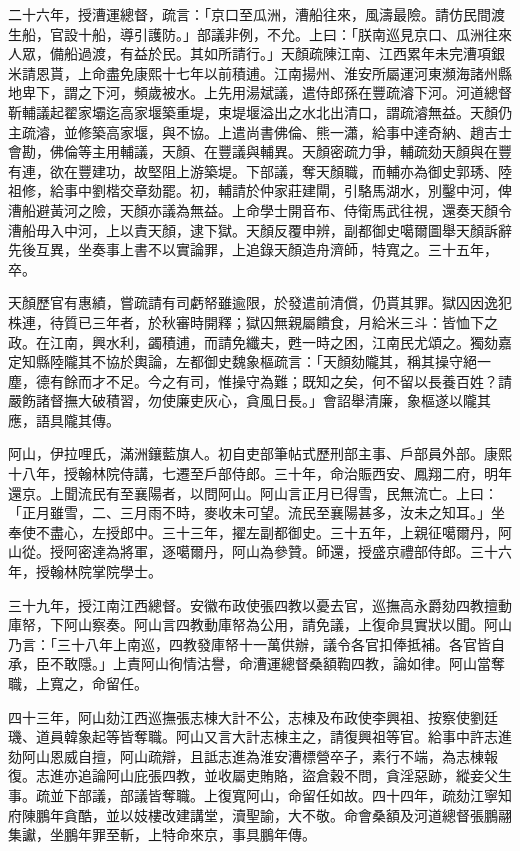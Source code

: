 \begin{pinyinscope}
二十六年，授漕運總督，疏言：「京口至瓜洲，漕船往來，風濤最險。請仿民間渡生船，官設十船，導引護防。」部議非例，不允。上曰：「朕南巡見京口、瓜洲往來人眾，備船過渡，有益於民。其如所請行。」天顏疏陳江南、江西累年未完漕項銀米請恩貰，上命盡免康熙十七年以前積逋。江南揚州、淮安所屬運河東瀕海諸州縣地卑下，謂之下河，頻歲被水。上先用湯斌議，遣侍郎孫在豐疏濬下河。河道總督靳輔議起翟家壩迄高家堰築重堤，束堤堰溢出之水北出清口，謂疏濬無益。天顏仍主疏濬，並修築高家堰，與不協。上遣尚書佛倫、熊一瀟，給事中達奇納、趙吉士會勘，佛倫等主用輔議，天顏、在豐議與輔異。天顏密疏力爭，輔疏劾天顏與在豐有連，欲在豐建功，故堅阻上游築堤。下部議，奪天顏職，而輔亦為御史郭琇、陸祖修，給事中劉楷交章劾罷。初，輔請於仲家莊建閘，引駱馬湖水，別鑿中河，俾漕船避黃河之險，天顏亦議為無益。上命學士開音布、侍衛馬武往視，還奏天顏令漕船毋入中河，上以責天顏，逮下獄。天顏反覆申辨，副都御史噶爾圖舉天顏訴辭先後互異，坐奏事上書不以實論罪，上追錄天顏造舟濟師，特寬之。三十五年，卒。

天顏歷官有惠績，嘗疏請有司虧帑雖逾限，於發遣前清償，仍貰其罪。獄囚因逸犯株連，待質已三年者，於秋審時開釋；獄囚無親屬饋食，月給米三斗：皆恤下之政。在江南，興水利，蠲積逋，而請免纖夫，甦一時之困，江南民尤頌之。獨劾嘉定知縣陸隴其不協於輿論，左都御史魏象樞疏言：「天顏劾隴其，稱其操守絕一塵，德有餘而才不足。今之有司，惟操守為難；既知之矣，何不留以長養百姓？請嚴飭諸督撫大破積習，勿使廉吏灰心，貪風日長。」會詔舉清廉，象樞遂以隴其應，語具隴其傳。

阿山，伊拉哩氏，滿洲鑲藍旗人。初自吏部筆帖式歷刑部主事、戶部員外部。康熙十八年，授翰林院侍講，七遷至戶部侍郎。三十年，命治賑西安、鳳翔二府，明年還京。上聞流民有至襄陽者，以問阿山。阿山言正月已得雪，民無流亡。上曰：「正月雖雪，二、三月雨不時，麥收未可望。流民至襄陽甚多，汝未之知耳。」坐奉使不盡心，左授郎中。三十三年，擢左副都御史。三十五年，上親征噶爾丹，阿山從。授阿密達為將軍，逐噶爾丹，阿山為參贊。師還，授盛京禮部侍郎。三十六年，授翰林院掌院學士。

三十九年，授江南江西總督。安徽布政使張四教以憂去官，巡撫高永爵劾四教擅動庫帑，下阿山察奏。阿山言四教動庫帑為公用，請免議，上復命具實狀以聞。阿山乃言：「三十八年上南巡，四教發庫帑十一萬供辦，議令各官扣俸抵補。各官皆自承，臣不敢隱。」上責阿山徇情沽譽，命漕運總督桑額鞫四教，論如律。阿山當奪職，上寬之，命留任。

四十三年，阿山劾江西巡撫張志棟大計不公，志棟及布政使李興祖、按察使劉廷璣、道員韓象起等皆奪職。阿山又言大計志棟主之，請復興祖等官。給事中許志進劾阿山恩威自擅，阿山疏辯，且詆志進為淮安漕標營卒子，素行不端，為志棟報復。志進亦追論阿山庇張四教，並收屬吏賄賂，盜倉穀不問，貪淫惡跡，縱妾父生事。疏並下部議，部議皆奪職。上復寬阿山，命留任如故。四十四年，疏劾江寧知府陳鵬年貪酷，並以妓樓改建講堂，瀆聖諭，大不敬。命會桑額及河道總督張鵬翮集讞，坐鵬年罪至斬，上特命來京，事具鵬年傳。


\end{pinyinscope}
